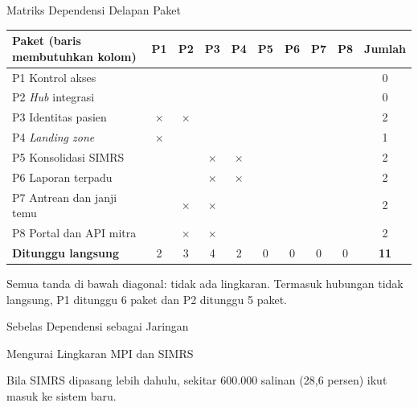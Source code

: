 \documentclass[aspectratio=169, table, 12pt]{beamer}
\begin{document}
\begin{frame}{{\Large Matriks Dependensi Delapan Paket}}
  \scriptsize
  \begin{tabularx}{\textwidth}{>{\raggedright\arraybackslash}Xccccccccc}
    \hline
    \textbf{Paket (baris membutuhkan kolom)} & \textbf{P1} & \textbf{P2} & \textbf{P3} & \textbf{P4} & \textbf{P5} & \textbf{P6} & \textbf{P7} & \textbf{P8} & \textbf{Jumlah} \\ \hline
    P1 Kontrol akses & & & & & & & & & 0 \\ \hline
    P2 \textit{Hub} integrasi & & & & & & & & & 0 \\ \hline
    P3 Identitas pasien & $\times$ & $\times$ & & & & & & & 2 \\ \hline
    P4 \textit{Landing zone} & $\times$ & & & & & & & & 1 \\ \hline
    P5 Konsolidasi SIMRS & & & $\times$ & $\times$ & & & & & 2 \\ \hline
    P6 Laporan terpadu & & & $\times$ & $\times$ & & & & & 2 \\ \hline
    P7 Antrean dan janji temu & & $\times$ & $\times$ & & & & & & 2 \\ \hline
    P8 Portal dan API mitra & & $\times$ & $\times$ & & & & & & 2 \\ \hline
    \textbf{Ditunggu langsung} & 2 & 3 & 4 & 2 & 0 & 0 & 0 & 0 & \textbf{11} \\ \hline
  \end{tabularx}

  \vspace{6pt}
  \small Semua tanda di bawah diagonal: tidak ada lingkaran. Termasuk hubungan tidak langsung, P1 ditunggu 6 paket dan P2
  ditunggu 5 paket.
\end{frame}

\begin{frame}{{\Large Sebelas Dependensi sebagai Jaringan}}
  \centering
  \begin{figure}
  \end{figure}
\end{frame}

\begin{frame}{{\Large Mengurai Lingkaran MPI dan SIMRS}}
  \centering
  \begin{figure}
  \end{figure}
  \vspace{-4pt}
  {\small Bila SIMRS dipasang lebih dahulu, sekitar 600.000 salinan (28,6 persen) ikut masuk ke sistem baru.}
\end{frame}
\end{document}
